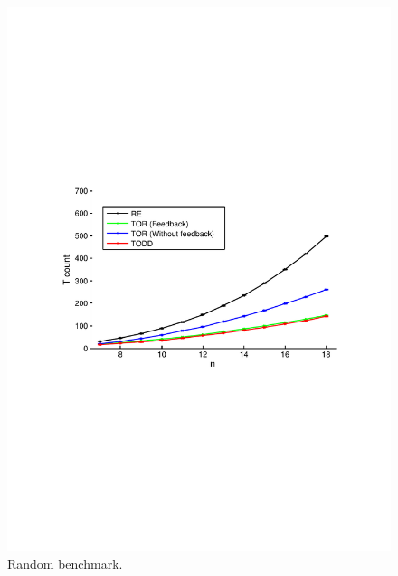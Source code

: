 \documentclass[notitlepage]{article}
\theoremstyle{definition}
\theoremstyle{problem}
\theoremstyle{lemma}
\begin{document}
	\begin{figure}
		\centering
		\includegraphics[width=\linewidth, trim={3cm 10cm 3cm 9.5cm},clip]{random_benchmark}
		\caption{
		Random benchmark.
		}
		\label{fig_random}
	\end{figure}
	
\end{document}
